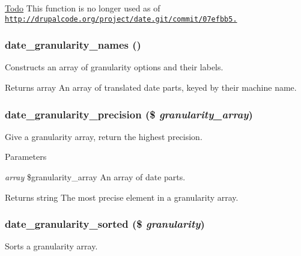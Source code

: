 \begin{Desc}
\item[\hyperlink{todo__todo000019}{Todo}]This function is no longer used as of \href{http://drupalcode.org/project/date.git/commit/07efbb5.}{\tt http://drupalcode.org/project/date.git/commit/07efbb5.} \end{Desc}
\hypertarget{date__api_8module_ae1883963cdb47632622f313139f35839}{
\subsubsection[{date\_\-granularity\_\-names}]{\setlength{\rightskip}{0pt plus 5cm}date\_\-granularity\_\-names ()}}
\label{date__api_8module_ae1883963cdb47632622f313139f35839}
Constructs an array of granularity options and their labels.

\begin{DoxyReturn}{Returns}
array An array of translated date parts, keyed by their machine name. 
\end{DoxyReturn}
\hypertarget{date__api_8module_af1576bf465ba626636ebe74667618c55}{
\subsubsection[{date\_\-granularity\_\-precision}]{\setlength{\rightskip}{0pt plus 5cm}date\_\-granularity\_\-precision (\$ {\em granularity\_\-array})}}
\label{date__api_8module_af1576bf465ba626636ebe74667618c55}
Give a granularity array, return the highest precision.


\begin{DoxyParams}{Parameters}
\item[{\em array}]\$granularity\_\-array An array of date parts.\end{DoxyParams}
\begin{DoxyReturn}{Returns}
string The most precise element in a granularity array. 
\end{DoxyReturn}
\hypertarget{date__api_8module_ad1999b95cf5c3ceb6672adbe08260a24}{
\subsubsection[{date\_\-granularity\_\-sorted}]{\setlength{\rightskip}{0pt plus 5cm}date\_\-granularity\_\-sorted (\$ {\em granularity})}}
\label{date__api_8module_ad1999b95cf5c3ceb6672adbe08260a24}
Sorts a granularity array.


